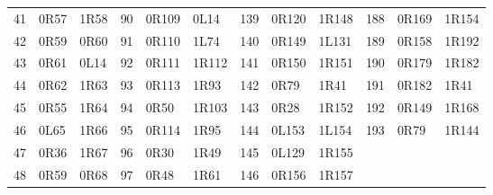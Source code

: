 \begin{longtable}{@{}rllrllrllrll@{}}
41 & 0R57 & 1R58 & 90 & 0R109 & 0L14 & 139 & 0R120 & 1R148 & 188 & 0R169 & 1R154\\
42 & 0R59 & 0R60 & 91 & 0R110 & 1L74 & 140 & 0R149 & 1L131 & 189 & 0R158 & 1R192\\
43 & 0R61 & 0L14 & 92 & 0R111 & 1R112 & 141 & 0R150 & 1R151 & 190 & 0R179 & 1R182\\
44 & 0R62 & 1R63 & 93 & 0R113 & 1R93 & 142 & 0R79 & 1R41 & 191 & 0R182 & 1R41\\
45 & 0R55 & 1R64 & 94 & 0R50 & 1R103 & 143 & 0R28 & 1R152 & 192 & 0R149 & 1R168\\
46 & 0L65 & 1R66 & 95 & 0R114 & 1R95 & 144 & 0L153 & 1L154 & 193 & 0R79 & 1R144\\
47 & 0R36 & 1R67 & 96 & 0R30 & 1R49 & 145 & 0L129 & 1R155 &  &  & \\
48 & 0R59 & 0R68 & 97 & 0R48 & 1R61 & 146 & 0R156 & 1R157 &  &  & \\
\bottomrule\end{longtable}\endgroup
